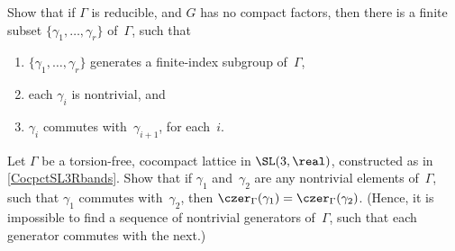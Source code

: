 \begin{exercises}
\item \label{RedCommGens}
 Show that if $\Gamma$ is reducible, and $G$ has no compact
factors, then there is a finite subset
$\{\gamma_1,\ldots,\gamma_r\}$ of~$\Gamma$, such that
 \begin{enumerate}
 \item $\{\gamma_1,\ldots,\gamma_r\}$ generates a
finite-index subgroup of~$\Gamma$,
 \item each $\gamma_i$ is nontrivial, and 
 \item $\gamma_i$ commutes with~$\gamma_{i+1}$, for each~$i$.
 \end{enumerate}
 

\item Let $\Gamma$ be a torsion-free, cocompact lattice in $\SL(3,\real)$, constructed as in \cref{CocpctSL3Rbands}. Show that if $\gamma_1$ and~$\gamma_2$ are any
nontrivial elements of~$\Gamma$, such that $\gamma_1$
commutes with~$\gamma_2$, then $\czer_{\Gamma}(\gamma_1) =
\czer_{\Gamma}(\gamma_2)$. (Hence, it is impossible to find a
sequence of nontrivial generators of~$\Gamma$, such that each generator
commutes with the next.)

 \end{exercises}







